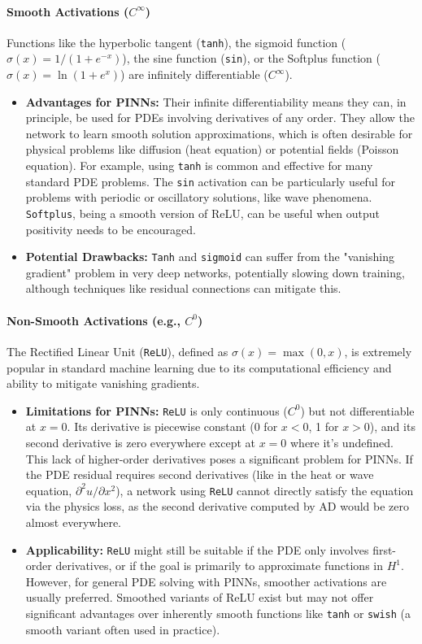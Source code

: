 \paragraph{Smooth Activations ($C^\infty$)} Functions like the hyperbolic tangent (\texttt{tanh}), the sigmoid function ($\sigma(x) = 1/(1+e^{-x})$), the sine function (\texttt{sin}), or the Softplus function ($\sigma(x) = \ln(1+e^x)$) are infinitely differentiable ($C^\infty$).
%
\begin{itemize}
    \item \textbf{Advantages for PINNs:} Their infinite differentiability means they can, in principle, be used for PDEs involving derivatives of any order. They allow the network to learn smooth solution approximations, which is often desirable for physical problems like diffusion (heat equation) or potential fields (Poisson equation). For example, using \texttt{tanh} is common and effective for many standard PDE problems. The \texttt{sin} activation can be particularly useful for problems with periodic or oscillatory solutions, like wave phenomena. \texttt{Softplus}, being a smooth version of ReLU, can be useful when output positivity needs to be encouraged.
    \item \textbf{Potential Drawbacks:} \texttt{Tanh} and \texttt{sigmoid} can suffer from the "vanishing gradient" problem in very deep networks, potentially slowing down training, although techniques like residual connections can mitigate this.
\end{itemize}

\paragraph{Non-Smooth Activations (e.g., $C^0$)} The Rectified Linear Unit (\texttt{ReLU}), defined as $\sigma(x) = \max(0, x)$, is extremely popular in standard machine learning due to its computational efficiency and ability to mitigate vanishing gradients.
%
\begin{itemize}
    \item \textbf{Limitations for PINNs:} \texttt{ReLU} is only continuous ($C^0$) but not differentiable at $x=0$. Its derivative is piecewise constant (0 for $x<0$, 1 for $x>0$), and its second derivative is zero everywhere except at $x=0$ where it's undefined. This lack of higher-order derivatives poses a significant problem for PINNs. If the PDE residual requires second derivatives (like in the heat or wave equation, $\partial^2 u / \partial x^2$), a network using \texttt{ReLU} cannot directly satisfy the equation via the physics loss, as the second derivative computed by AD would be zero almost everywhere.
    \item \textbf{Applicability:} \texttt{ReLU} might still be suitable if the PDE only involves first-order derivatives, or if the goal is primarily to approximate functions in $H^1$. However, for general PDE solving with PINNs, smoother activations are usually preferred. Smoothed variants of ReLU exist but may not offer significant advantages over inherently smooth functions like \texttt{tanh} or \texttt{swish} (a smooth variant often used in practice).
\end{itemize}

